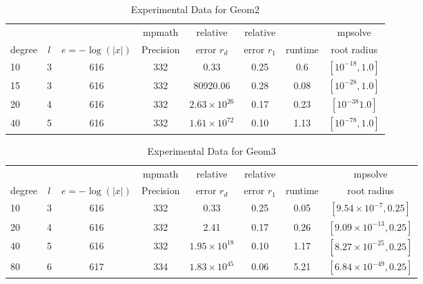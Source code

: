 \documentclass[sigconf]{acmart}
\begin{document}
\begin{table}[t]
\caption{Experimental Data for Geom2}
\label{tab:geom2}
\vskip -0.15in
\begin{center}
\begin{small}
\begin{sc}
\begin{tabular}{lccccccc}
\toprule
&  &  & mpmath & relative  & relative &  & mpsolve \\
degree  & $l$& $e=-\log(|x|)$& Precision &error $r_d$       & error $r_1$ &runtime& root radius\\
\midrule
   10 & 3 & 616 & 332 & 0.33 & 0.25 & 0.6 & $[10^{-18},1.0]$ \\
   15 & 3 & 616 & 332 & 80920.06  & 0.28 & 0.08 & $[10^{-28},1.0]$\\
   20 & 4 & 616 & 332 & $2.63 \times 10^{26}$ & 0.17 & 0.23 & $[10^{-38}1.0]$\\ %
   40 & 5 & 616 & 332 &  $1.61 \times 10^{72}$ & 0.10 & 1.13 & $[10^{-78},1.0]$\\ %
\bottomrule
\end{tabular}
\end{sc}
\end{small}
\end{center}
\vskip 0.05in
\end{table}

\begin{table}[t]
\caption{Experimental Data for Geom3}
\label{tab:geom3}
\vskip -0.15in
\begin{center}
\begin{small}
\begin{sc}
\begin{tabular}{lccccccc}
\toprule
&  &  & mpmath & relative  & relative &  & mpsolve \\
degree  & $l$& $e=-\log(|x|)$& Precision &error $r_d$       & error $r_1$ &runtime& root radius\\
\midrule
   10 & 3 & 616 & 332 & 0.33 & 0.25 & 0.05 & $[9.54 \times 10^{-7},0.25]$ \\
   20 & 4 & 616 & 332 & 2.41 & 0.17 & 0.26 & $[9.09 \times 10^{-13},0.25]$\\
   40 & 5 & 616 & 332 & $1.95 \times 10^{18}$ & 0.10 & 1.17 & $[8.27 \times 10^{-25},0.25]$\\ %
   80 & 6 & 617 & 334 & $1.83 \times 10^{45}$ & 0.06 & 5.21 & $[6.84 \times 10^{-49},0.25]$\\ %
\bottomrule
\end{tabular}
\end{sc}
\end{small}
\end{center}
\vskip 0.05in
\end{table}
\end{document}

